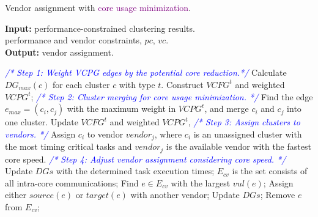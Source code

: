 \documentclass[10pt,journal, compsoc]{IEEEtran}
\begin{document}
\begin{algorithm}[!h]
\caption{Vendor assignment with \textcolor{purple}{core usage minimization}.}
\label{alg:VA}
{\textbf{Input:}}
performance-constrained clustering results.\\
\hspace*{2.4em} performance and vendor constraints, $pc$, $vc$.\\
{\textbf{Output:}} vendor assignment.
\begin{algorithmic}[1]
\STATEx \hspace*{-\algorithmicindent}\textit{\textcolor{blue}{/* Step 1: Weight VCPG edges by the potential core reduction.*/}}
\STATE Calculate $DG_{max}(c)$ for each cluster $c$ with type $t$.
\STATE Construct $VCFG^t$ and weighted $VCPG^t$;
\STATEx \hspace*{-\algorithmicindent}\textit{\textcolor{blue}{/* Step 2: Cluster merging for core usage minimization. */}}
\STATE Find the edge $e_{max}=(c_i,c_j)$ with the maximum weight in $VCPG^t$, and merge $c_i$ and $c_j$ into one cluster.
\STATE Update $VCFG^t$ and weighted $VCPG^t$,
\ENDWHILE
\STATEx \hspace*{-\algorithmicindent}\textit{\textcolor{blue}{/* Step 3: Assign clusters to vendors. */}}
    \STATE Assign $c_i$ to vendor $vendor_j$, where $c_i$ is an unassigned cluster with the most timing critical tasks and $vendor_j$ is the available vendor with the fastest core speed.
\ENDWHILE
\ENDFOR
\STATEx \hspace*{-\algorithmicindent}\textit{\textcolor{blue}{/* Step 4: Adjust vendor assignment considering core speed. */}}
\STATE Update $DGs$ with the determined task execution times;
\STATE $E_{cv}$ is the set consists of all intra-core communications;
\STATE Find $e\in E_{cv}$ with the largest $vul(e)$;
\STATE Assign either $source(e)$ or $target(e)$ with another vendor;
\STATE Update $DGs$;
\ENDIF
\STATE Remove $e$ from $E_{cv}$;
\ENDWHILE
\end{algorithmic}
\end{algorithm}
\end{document}
